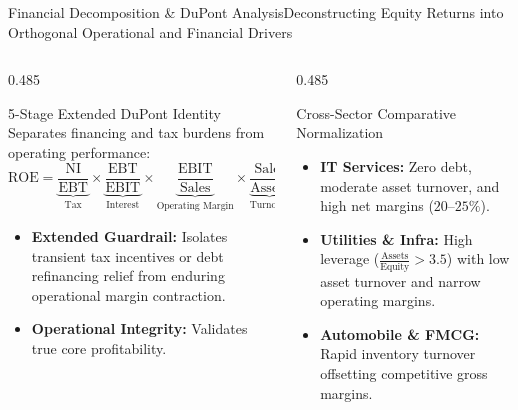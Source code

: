 \begin{frame}{Financial Decomposition \& DuPont Analysis}{Deconstructing Equity Returns into Orthogonal Operational and Financial Drivers}
\begin{columns}[T,onlytextwidth]
\begin{column}{0.485\textwidth}
            \begin{mathcard}[height=2.74cm]{5-Stage Extended DuPont Identity}
                \fontsize{5.6pt}{6.8pt}\selectfont
                Separates financing and tax burdens from operating performance:
                \begin{equation*}
                    \textstyle \text{ROE} = \underbrace{\frac{\text{NI}}{\text{EBT}}}_{\text{Tax}} \times \underbrace{\frac{\text{EBT}}{\text{EBIT}}}_{\text{Interest}} \times \underbrace{\frac{\text{EBIT}}{\text{Sales}}}_{\text{Operating Margin}} \times \underbrace{\frac{\text{Sales}}{\text{Assets}}}_{\text{Turnover}} \times \underbrace{\frac{\text{Assets}}{\text{Equity}}}_{\text{Leverage}}
                \end{equation*}
                \begin{itemize}
                    \setlength{\itemsep}{1.2pt}
                    \item \textbf{Extended Guardrail:} Isolates transient tax incentives or debt refinancing relief from enduring operational margin contraction.
                    \item \textbf{Operational Integrity:} Validates true core profitability.
                \end{itemize}
            \end{mathcard}
        \end{column}

        \begin{column}{0.485\textwidth}
            \begin{quantcard}[height=2.74cm]{Cross-Sector Comparative Normalization}
                \fontsize{5.8pt}{7.0pt}\selectfont
                \begin{itemize}
                    \setlength{\itemsep}{1.5pt}
                    \item \textbf{IT Services:} Zero debt, moderate asset turnover, and high net margins ($20\text{--}25\%$).
                    \item \textbf{Utilities \& Infra:} High leverage ($\frac{\text{Assets}}{\text{Equity}} > 3.5$) with low asset turnover and narrow operating margins.
                    \item \textbf{Automobile \& FMCG:} Rapid inventory turnover offsetting competitive gross margins.
                \end{itemize}
            \end{quantcard}


\end{column}
\end{columns}
\end{frame}
